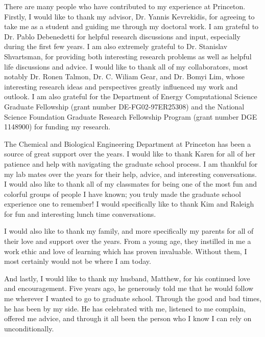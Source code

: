 
There are many people who have contributed to my experience at Princeton. 
%
Firstly, I would like to thank my advisor, Dr. Yannis Kevrekidis, for agreeing to take me as a student and guiding me through my doctoral work. 
%
I am grateful to Dr. Pablo Debenedetti for helpful research discussions and input, especially during the first few years. 
%
I am also extremely grateful to Dr. Stanislav Shvartsman, for providing both interesting research problems as well as helpful life discussions and advice. 
%
I would like to thank all of my collaborators, most notably Dr. Ronen Talmon, Dr. C. Wiliam Gear, and Dr. Bomyi Lim, whose interesting research ideas and perspectives greatly influenced my work and outlook.
%
I am also grateful for the Department of Energy Computational Science Graduate Fellowship (grant number DE-FG02-97ER25308) and the National Science Foundation Graduate Research Fellowship Program (grant number DGE 1148900) for funding my research. 

The Chemical and Biological Engineering Department at Princeton has been a source of great support over the years.
%
I would like to thank Karen for all of her patience and help with navigating the graduate school process. 
%
I am thankful for my lab mates over the years for their help, advice, and interesting conversations.
%
I would also like to thank all of my classmates for being one of the most fun and colorful groups of people I have known; you truly made the graduate school experience one to remember!
%
I would specifically like to thank Kim and Raleigh for fun and interesting lunch time conversations.

I would also like to thank my family, and more specifically my parents for all of their love and support over the years. 
%
From a young age, they instilled in me a work ethic and love of learning which has proven invaluable. 
%
Without them, I most certainly would not be where I am today. 

And lastly, I would like to thank my husband, Matthew, for his continued love and encouragement. 
%
Five years ago, he generously told me that he would follow me wherever I wanted to go to graduate school. 
%
Through the good and bad times, he has been by my side. 
%
He has celebrated with me, listened to me complain, offered me advice, and through it all been the person who I know I can rely on unconditionally. 
